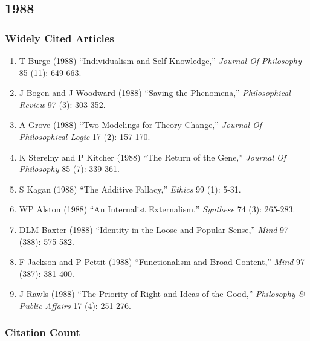 \documentclass[
  10pt,
  letterpaper,
  DIV=11,
  numbers=noendperiod,
  twoside]{scrartcl}
\providecommand{\tightlist}{%
  \setlength{\itemsep}{0pt}\setlength{\parskip}{0pt}}\usepackage{longtable,booktabs,array}
\begin{document}
\newpage

\subsection{1988}\label{sec-s1988}

\subsubsection*{Widely Cited Articles}\label{widely-cited-articles-32}

\begin{enumerate}
\def\labelenumi{\arabic{enumi}.}
\tightlist
\item
  T Burge (1988) ``Individualism and Self-Knowledge,'' \emph{Journal Of
  Philosophy} 85 (11): 649-663.
\item
  J Bogen and J Woodward (1988) ``Saving the Phenomena,''
  \emph{Philosophical Review} 97 (3): 303-352.
\item
  A Grove (1988) ``Two Modelings for Theory Change,'' \emph{Journal Of
  Philosophical Logic} 17 (2): 157-170.
\item
  K Sterelny and P Kitcher (1988) ``The Return of the Gene,''
  \emph{Journal Of Philosophy} 85 (7): 339-361.
\item
  S Kagan (1988) ``The Additive Fallacy,'' \emph{Ethics} 99 (1): 5-31.
\item
  WP Alston (1988) ``An Internalist Externalism,'' \emph{Synthese} 74
  (3): 265-283.
\item
  DLM Baxter (1988) ``Identity in the Loose and Popular Sense,''
  \emph{Mind} 97 (388): 575-582.
\item
  F Jackson and P Pettit (1988) ``Functionalism and Broad Content,''
  \emph{Mind} 97 (387): 381-400.
\item
  J Rawls (1988) ``The Priority of Right and Ideas of the Good,''
  \emph{Philosophy \& Public Affairs} 17 (4): 251-276.
\end{enumerate}

\subsubsection*{Citation Count}\label{sec-count-1988}
\end{document}

